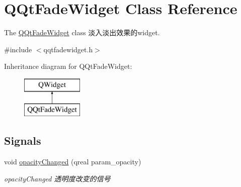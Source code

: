 \hypertarget{class_q_qt_fade_widget}{}\section{Q\+Qt\+Fade\+Widget Class Reference}
\label{class_q_qt_fade_widget}


The \mbox{\hyperlink{class_q_qt_fade_widget}{Q\+Qt\+Fade\+Widget}} class 淡入淡出效果的widget.  




{\ttfamily \#include $<$qqtfadewidget.\+h$>$}

Inheritance diagram for Q\+Qt\+Fade\+Widget\+:\begin{figure}[H]
\begin{center}
\leavevmode
\includegraphics[height=2.000000cm]{class_q_qt_fade_widget}
\end{center}
\end{figure}
\subsection*{Signals}
\begin{DoxyCompactItemize}
\item 
void \mbox{\hyperlink{class_q_qt_fade_widget_a20b63cf911542b214040d1f87661fa72}{opacity\+Changed}} (qreal param\+\_\+opacity)
\begin{DoxyCompactList}\small\item\em opacity\+Changed 透明度改变的信号 \end{DoxyCompactList}\end{DoxyCompactItemize}
